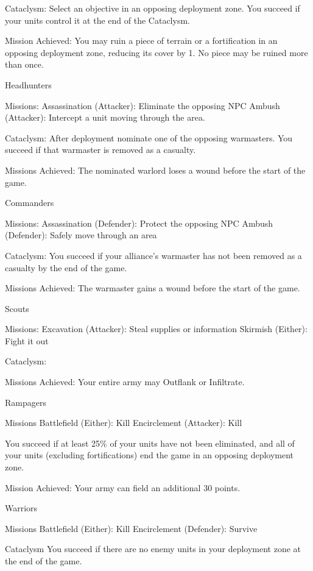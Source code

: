 Cataclysm:
  Select an objective in an opposing deployment zone.
  You succeed if your units control it at the end of the Cataclysm.

Mission Achieved:
  You may ruin a piece of terrain or a fortification in an opposing
  deployment zone, reducing its cover by 1.
  No piece may be ruined more than once.



Headhunters

Missions:
  Assassination (Attacker): Eliminate the opposing NPC
  Ambush (Attacker): Intercept a unit moving through the area.

Cataclysm:
  After deployment nominate one of the opposing warmasters.
  You succeed if that warmaster is removed as a casualty.

Missions Achieved:
  The nominated warlord loses a wound before the start of the game.



Commanders

Missions:
  Assassination (Defender): Protect the opposing NPC
  Ambush (Defender): Safely move through an area

Cataclysm:
  You succeed if your alliance's warmaster has not been removed as a casualty by the end of the game.

Missions Achieved:
  The warmaster gains a wound before the start of the game.



Scouts

Missions:
  Excavation (Attacker): Steal supplies or information
  Skirmish (Either): Fight it out

Cataclysm:

Missions Achieved:
  Your entire army may Outflank or Infiltrate.




Rampagers

Missions
  Battlefield (Either): Kill
  Encirclement (Attacker): Kill

  You succeed if at least 25\% of your units have not been eliminated,
  and all of your units (excluding fortifications) end the game in
  an opposing deployment zone.

Mission Achieved:
  Your army can field an additional 30 points.


Warriors

Missions
  Battlefield (Either): Kill
  Encirclement (Defender): Survive

Cataclysm
  You succeed if there are no enemy units in your deployment zone at the end of the game.


